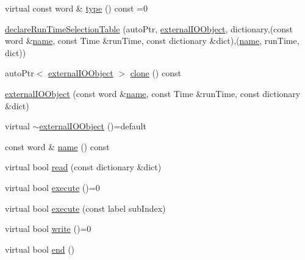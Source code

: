\begin{DoxyCompactItemize}
\item 
virtual const word \& \hyperlink{classFoam_1_1externalIOObject_1_1externalIOObject_a116f50bec7e5649751b6478270a9ee5f}{type} () const =0
\item 
\hyperlink{classFoam_1_1externalIOObject_1_1externalIOObject_a272c7b6ce8c77c24fb0b9bf09de3e519}{declare\+Run\+Time\+Selection\+Table} (auto\+Ptr, \hyperlink{classFoam_1_1externalIOObject_1_1externalIOObject}{external\+I\+O\+Object}, dictionary,(const word \&\hyperlink{classFoam_1_1externalIOObject_1_1externalIOObject_ade4113569ef0db70665fded275a5e38e}{name}, const Time \&run\+Time, const dictionary \&dict),(\hyperlink{classFoam_1_1externalIOObject_1_1externalIOObject_ade4113569ef0db70665fded275a5e38e}{name}, run\+Time, dict))
\item 
auto\+Ptr$<$ \hyperlink{classFoam_1_1externalIOObject_1_1externalIOObject}{external\+I\+O\+Object} $>$ \hyperlink{classFoam_1_1externalIOObject_1_1externalIOObject_ad9d73d7c7a5f9f42d5d4554fd3445a75}{clone} () const
\item 
\hyperlink{classFoam_1_1externalIOObject_1_1externalIOObject_a634c9c39a496123d761ec4b0fec244ac}{external\+I\+O\+Object} (const word \&\hyperlink{classFoam_1_1externalIOObject_1_1externalIOObject_ade4113569ef0db70665fded275a5e38e}{name}, const Time \&run\+Time, const dictionary \&dict)
\item 
virtual \hyperlink{classFoam_1_1externalIOObject_1_1externalIOObject_ae5b4904fdfe3e0cd0a91177e1f9b39e9}{$\sim$external\+I\+O\+Object} ()=default
\item 
const word \& \hyperlink{classFoam_1_1externalIOObject_1_1externalIOObject_ade4113569ef0db70665fded275a5e38e}{name} () const
\item 
virtual bool \hyperlink{classFoam_1_1externalIOObject_1_1externalIOObject_a6ce0c64db98eb6144d363dbfc86104eb}{read} (const dictionary \&dict)
\item 
virtual bool \hyperlink{classFoam_1_1externalIOObject_1_1externalIOObject_a6a2fecba3df663a5e8d1c371795e3763}{execute} ()=0
\item 
virtual bool \hyperlink{classFoam_1_1externalIOObject_1_1externalIOObject_aa34e71b0c0b54ff2bee2a9519ca85034}{execute} (const label sub\+Index)
\item 
virtual bool \hyperlink{classFoam_1_1externalIOObject_1_1externalIOObject_afb09203164c30c34e8eca81ef0211745}{write} ()=0
\item 
virtual bool \hyperlink{classFoam_1_1externalIOObject_1_1externalIOObject_af545ab12986d2fe462f1013c3bafb5f3}{end} ()

\end{DoxyCompactItemize}
